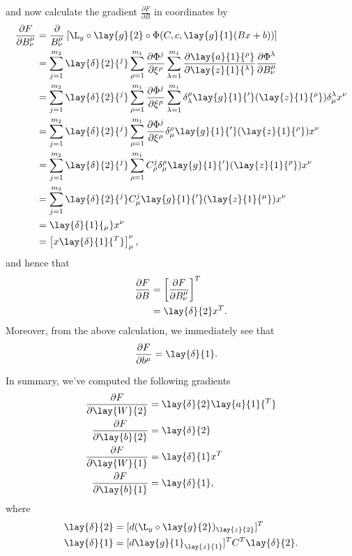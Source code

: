 and now calculate the gradient $\frac{\partial F}{\partial B}$ in coordinates by
\begin{align*}
	\frac{\partial F}{\partial B^\mu_\nu}&=\frac{\partial}{B^\mu_\nu}\left[\L_y\circ\lay{g}{2}\circ\Phi(C,c,\lay{g}{1}(Bx+b))\right]\\
	&=\sum_{j=1}^{m_2}\lay{\delta}{2}{^j}\sum_{\rho=1}^{m_1}\frac{\partial\Phi^j}{\partial \xi^\rho}\sum_{\lambda=1}^{m_1}\frac{\partial \lay{a}{1}{^\rho}}{\partial \lay{z}{1}{^\lambda}}\frac{\partial \Phi^\lambda}{\partial B^\mu_\nu}\\
	&=\sum_{j=1}^{m_2}\lay{\delta}{2}{^j}\sum_{\rho=1}^{m_1}\frac{\partial\Phi^j}{\partial \xi^\rho}\sum_{\lambda=1}^{m_1}
	\delta^\rho_\lambda \lay{g}{1}{'}(\lay{z}{1}{^\rho})
	\delta^{\lambda}_\mu x^\nu\\
	&=\sum_{j=1}^{m_2}\lay{\delta}{2}{^j}\sum_{\rho=1}^{m_1}\frac{\partial\Phi^j}{\partial \xi^\rho}\delta^\rho_\mu\lay{g}{1}{'}(\lay{z}{1}{^\rho})x^\nu\\
	&=\sum_{j=1}^{m_2}\lay{\delta}{2}{^j}\sum_{\rho=1}^{m_1}C^j_\rho\delta^\rho_\mu\lay{g}{1}{'}(\lay{z}{1}{^\rho})x^\nu\\
	&=\sum_{j=1}^{m_2}\lay{\delta}{2}{^j}C^j_\mu\lay{g}{1}{'}(\lay{z}{1}{^\mu})x^\nu\\
	&=\lay{\delta}{1}{_\mu}x^\nu\\
	&=\left[x\lay{\delta}{1}{^T}\right]^\nu_\mu,
\end{align*}
and hence that
\begin{align*}
	\frac{\partial F}{\partial B}&=\left[\frac{\partial F}{\partial B^\mu_\nu}\right]^T\\
	&=\lay{\delta}{2}x^T.
\end{align*}
Moreover, from the above calculation, we immediately see that
\begin{align*}
	\frac{\partial F}{\partial b^\mu}&=\lay{\delta}{1}.
\end{align*}

In summary, we've computed the following gradients
\begin{align*}
	\frac{\partial F}{\partial\lay{W}{2}}&=\lay{\delta}{2}\lay{a}{1}{^T}\\
	\frac{\partial F}{\partial\lay{b}{2}}&=\lay{\delta}{2}\\
	\frac{\partial F}{\partial\lay{W}{1}}&=\lay{\delta}{1}x^T\\
	\frac{\partial F}{\partial\lay{b}{1}}&=\lay{\delta}{1},
\end{align*}
where
\begin{align*}
	\lay{\delta}{2}&=[d(\L_y\circ\lay{g}{2})_{\lay{z}{2}}]^T\\
	\lay{\delta}{1}&=[d\lay{g}{1}_{\lay{z}{1}}]^TC^T\lay{\delta}{2}.
\end{align*}

